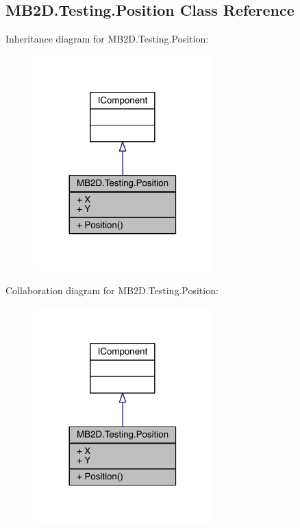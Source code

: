 \hypertarget{class_m_b2_d_1_1_testing_1_1_position}{}\subsection{M\+B2\+D.\+Testing.\+Position Class Reference}
\label{class_m_b2_d_1_1_testing_1_1_position}


Inheritance diagram for M\+B2\+D.\+Testing.\+Position\+:
\nopagebreak
\begin{figure}[H]
\begin{center}
\leavevmode
\includegraphics[width=197pt]{class_m_b2_d_1_1_testing_1_1_position__inherit__graph}
\end{center}
\end{figure}


Collaboration diagram for M\+B2\+D.\+Testing.\+Position\+:
\nopagebreak
\begin{figure}[H]
\begin{center}
\leavevmode
\includegraphics[width=197pt]{class_m_b2_d_1_1_testing_1_1_position__coll__graph}
\end{center}
\end{figure}
